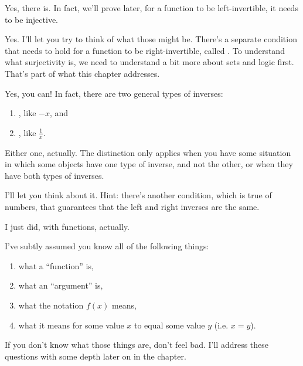 Yes, there is. In fact, we'll prove later, for a function to be
left-invertible, it needs to be injective.


Yes. I'll let you try to think of what those might be. There's a
separate condition that needs to hold for a function to be
right-invertible, called . To understand what
surjectivity is, we need to understand a bit more about sets and logic
first. That's part of what this chapter addresses.



Yes, you can! In fact, there are two general types of inverses:

\begin{enumerate}
\item {}, like $-x$, and
\item {}, like $\frac{1}{x}$.
\end{enumerate}


Either one, actually. The distinction only applies when you have some
situation in which some objects have one type of inverse, and not the
other, or when they have both types of inverses.


I'll let you think about it. Hint: there's another condition, which is
true of numbers, that guarantees that the left and right inverses are
the same.


I just did, with functions, actually.

\begin{remark}
  I've subtly assumed you know all of the following things:

  \begin{enumerate}
  \item what a ``function'' is,
  \item what an ``argument'' is,
  \item what the notation $f(x)$ means,
  \item what it means for some value $x$ to equal some value $y$
    (i.e. $x = y$).
  \end{enumerate}

  If you don't know what those things are, don't feel bad. I'll
  address these questions with some depth later on in the chapter.
\end{remark}

